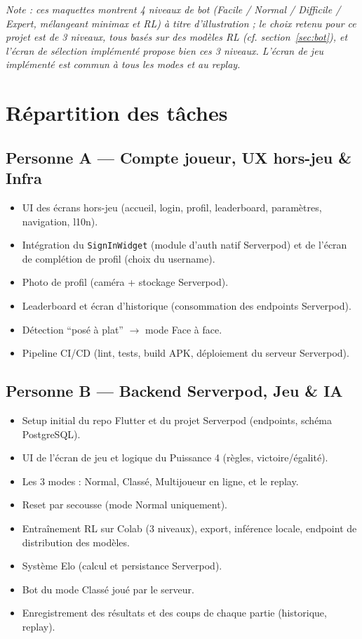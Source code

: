 \documentclass[a4paper,11pt]{article}
\begin{document}
\textit{Note : ces maquettes montrent 4 niveaux de bot (Facile / Normal / Difficile /
Expert, mélangeant minimax et RL) à titre d'illustration ; le choix retenu pour ce
projet est de 3 niveaux, tous basés sur des modèles RL (cf. section~\ref{sec:bot}),
et l'écran de sélection implémenté propose bien ces 3 niveaux. L'écran de jeu
implémenté est commun à tous les modes et au replay.}

\section{Répartition des tâches}

\subsection{Personne A --- Compte joueur, UX hors-jeu \& Infra}
\begin{itemize}[leftmargin=1.5em]
  \item UI des écrans hors-jeu (accueil, login, profil, leaderboard, paramètres,
        navigation, l10n).
  \item Intégration du \texttt{SignInWidget} (module d'auth natif Serverpod) et de
        l'écran de complétion de profil (choix du username).
  \item Photo de profil (caméra + stockage Serverpod).
  \item Leaderboard et écran d'historique (consommation des endpoints Serverpod).
  \item Détection ``posé à plat'' $\rightarrow$ mode Face à face.
  \item Pipeline CI/CD (lint, tests, build APK, déploiement du serveur Serverpod).
\end{itemize}

\subsection{Personne B --- Backend Serverpod, Jeu \& IA}
\begin{itemize}[leftmargin=1.5em]
  \item Setup initial du repo Flutter et du projet Serverpod (endpoints, schéma
        PostgreSQL).
  \item UI de l'écran de jeu et logique du Puissance 4 (règles, victoire/égalité).
  \item Les 3 modes : Normal, Classé, Multijoueur en ligne, et le replay.
  \item Reset par secousse (mode Normal uniquement).
  \item Entraînement RL sur Colab (3 niveaux), export, inférence locale, endpoint de
        distribution des modèles.
  \item Système Elo (calcul et persistance Serverpod).
  \item Bot du mode Classé joué par le serveur.
  \item Enregistrement des résultats et des coups de chaque partie (historique,
        replay).
\end{itemize}
\end{document}

